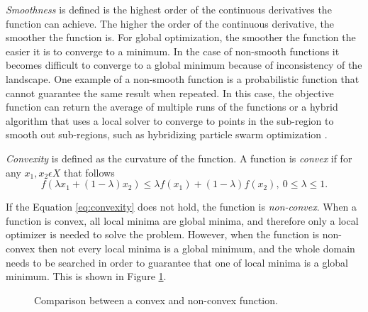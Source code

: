 \textit{Smoothness} is defined is the highest order of the continuous derivatives the function can achieve. The higher the order of the continuous derivative, the smoother the function is. For global optimization, the smoother the function the easier it is to converge to a minimum. In the case of non-smooth functions it becomes difficult to converge to a global minimum because of inconsistency of the landscape. One example of a non-smooth function is a probabilistic function that cannot guarantee the same result when repeated. In this case, the objective function can return the average of multiple runs of the functions or a hybrid algorithm that uses a local solver to converge to points in the sub-region to smooth out sub-regions, such as hybridizing particle swarm optimization \cite{Kaveh2014}.

\textit{Convexity} is defined as the curvature of the function. A function is \textit{convex} if for any $x_1,x_2 \epsilon X$ that follows
\begin{equation}
    \label{eq:convexity}
    f(\lambda x_1 + (1-\lambda)x_2) \leq \lambda f(x_1)+(1-\lambda)f(x_2),\ 0 \leq \lambda \leq 1.
\end{equation}

If the Equation \ref{eq:convexity} does not hold, the function is \textit{non-convex}. When a function is convex, all local minima are global minima, and therefore only a local optimizer is needed to solve the problem. However, when the function is non-convex then not every local minima is a global minimum, and the whole domain needs to be searched in order to guarantee that one of local minima is a global minimum. This is shown in Figure \ref{fig:convexity}.  

\begin{figure}[!h]
  
  \begin{subfigure}[t]{0.5\textwidth}
      \caption{}
    \end{subfigure}
    \begin{subfigure}[t]{0.5\textwidth}
      \caption{}
    \end{subfigure}
  \caption{Comparison between a convex and non-convex function.}
  \label{fig:convexity}
\end{figure}

